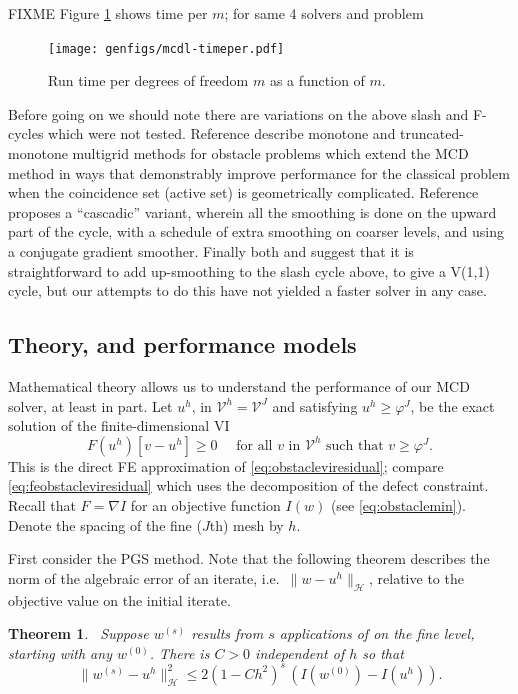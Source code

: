\documentclass[letterpaper,final,12pt,reqno]{amsart}
\theoremstyle{claim}
\newtheorem{theorem}{Theorem}
\newcommand{\grad}{\nabla}
\numberwithin{equation}{section}
\numberwithin{figure}{section}
\numberwithin{table}{section}
\numberwithin{theorem}{section}
\begin{document}
FIXME Figure \ref{fig:mcdl-timeper} shows time per $m$; for same 4 solvers and problem

\begin{figure}
\texttt{[image: genfigs/mcdl-timeper.pdf]}
\caption{Run time per degrees of freedom $m$ as a function of $m$.}
\label{fig:mcdl-timeper}
\end{figure}

Before going on we should note there are variations on the above slash and F-cycles which were not tested.  Reference \cite{GraeserKornhuber2009} describe monotone and truncated-monotone multigrid methods for obstacle problems which extend the MCD method in ways that demonstrably improve performance for the classical problem when the coincidence set (active set) is geometrically complicated.  Reference \cite{Blumetal2004} proposes a ``cascadic'' variant, wherein all the smoothing is done on the upward part of the cycle, with a schedule of extra smoothing on coarser levels, and using a conjugate gradient smoother.  Finally both \cite{Tai2003} and \cite{GraeserKornhuber2009} suggest that it is straightforward to add up-smoothing to the slash cycle above, to give a V(1,1) cycle, but our attempts to do this have not yielded a faster solver in any case.

\subsection*{Theory, and performance models}  Mathematical theory allows us to understand the performance of our MCD solver, at least in part.  Let $u^h$, in $\mathcal{V}^h = \mathcal{V}^J$ and satisfying $u^h \ge \varphi^J$, be the exact solution of the finite-dimensional VI
\begin{equation}
  F(u^h)[v-u^h] \ge 0 \quad \text{ for all } v \text{ in $\mathcal{V}^h$ such that } v \ge \varphi^J. \label{eq:feobstaclevioriginal}
\end{equation}
This is the direct FE approximation of \eqref{eq:obstacleviresidual}; compare \eqref{eq:feobstacleviresidual} which uses the decomposition of the defect constraint.  Recall that $F=\grad I$ for an objective function $I(w)$ (see \eqref{eq:obstaclemin}).  Denote the spacing of the fine ($J$th) mesh by $h$.

First consider the PGS method.  Note that the following theorem describes the norm of the algebraic error of an iterate, i.e.~$\|w-u^h\|_{\mathcal{H}}$, relative to the objective value on the initial iterate.

\begin{theorem} \cite[Prop.~4.5]{GraeserKornhuber2009}\,  \label{thm:pgsconvergence}  Suppose $w^{(s)}$  results from $s$ applications of  on the fine level, starting with any $w^{(0)}$.  There is $C>0$ independent of $h$ so that
\begin{equation}
  \|w^{(s)} - u^h\|_{\mathcal{H}}^2 \le 2 (1-C h^2)^s\,\left(I(w^{(0)}) - I(u^h)\right).  \label{eq:pgsconvergence}
\end{equation}
\end{theorem}
\end{document}

